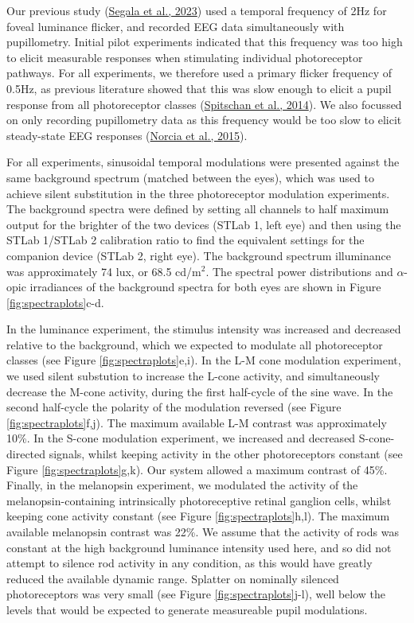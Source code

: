 \documentclass[
]{article}
\begin{document}
Our previous study (\protect\hyperlink{ref-Segala2023}{Segala et al., 2023}) used a temporal frequency of 2Hz for foveal luminance flicker, and recorded EEG data simultaneously with pupillometry. Initial pilot experiments indicated that this frequency was too high to elicit measurable responses when stimulating individual photoreceptor pathways. For all experiments, we therefore used a primary flicker frequency of 0.5Hz, as previous literature showed that this was slow enough to elicit a pupil response from all photoreceptor classes (\protect\hyperlink{ref-Spitschan2014}{Spitschan et al., 2014}). We also focussed on only recording pupillometry data as this frequency would be too slow to elicit steady-state EEG responses (\protect\hyperlink{ref-Norcia2015}{Norcia et al., 2015}).

For all experiments, sinusoidal temporal modulations were presented against the same background spectrum (matched between the eyes), which was used to achieve silent substitution in the three photoreceptor modulation experiments. The background spectra were defined by setting all channels to half maximum output for the brighter of the two devices (STLab 1, left eye) and then using the STLab 1/STLab 2 calibration ratio to find the equivalent settings for the companion device (STLab 2, right eye). The background spectrum illuminance was approximately 74 lux, or 68.5 cd/m\(^2\). The spectral power distributions and \(\alpha\)-opic irradiances of the background spectra for both eyes are shown in Figure \ref{fig:spectraplots}c-d.

In the luminance experiment, the stimulus intensity was increased and decreased relative to the background, which we expected to modulate all photoreceptor classes (see Figure \ref{fig:spectraplots}e,i). In the L-M cone modulation experiment, we used silent substution to increase the L-cone activity, and simultaneously decrease the M-cone activity, during the first half-cycle of the sine wave. In the second half-cycle the polarity of the modulation reversed (see Figure \ref{fig:spectraplots}f,j). The maximum available L-M contrast was approximately 10\%. In the S-cone modulation experiment, we increased and decreased S-cone-directed signals, whilst keeping activity in the other photoreceptors constant (see Figure \ref{fig:spectraplots}g,k). Our system allowed a maximum contrast of 45\%. Finally, in the melanopsin experiment, we modulated the activity of the melanopsin-containing intrinsically photoreceptive retinal ganglion cells, whilst keeping cone activity constant (see Figure \ref{fig:spectraplots}h,l). The maximum available melanopsin contrast was 22\%. We assume that the activity of rods was constant at the high background luminance intensity used here, and so did not attempt to silence rod activity in any condition, as this would have greatly reduced the available dynamic range. Splatter on nominally silenced photoreceptors was very small (see Figure \ref{fig:spectraplots}j-l), well below the levels that would be expected to generate measureable pupil modulations.
\end{document}
